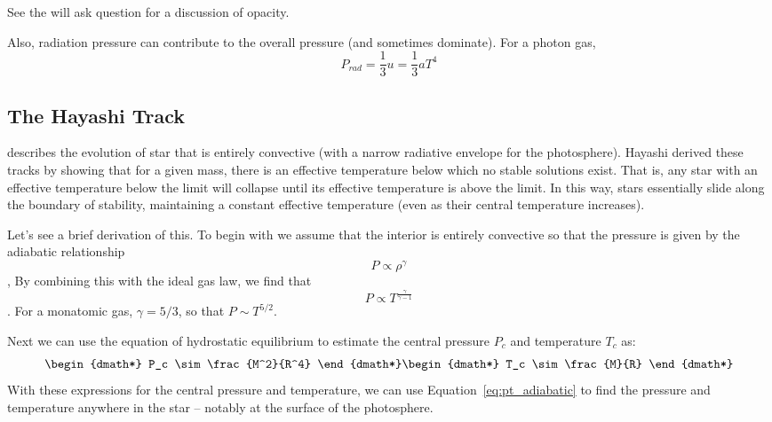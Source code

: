 See the will ask question for a discussion of opacity.

Also, radiation pressure can contribute to the overall pressure (and sometimes dominate).  
For a photon gas,
\begin{equation}
P_{rad}=\frac{1}{3}u=\frac{1}{3}aT^4
\end{equation}

\subsection{The Hayashi Track}
describes the evolution of star that is entirely convective
(with a narrow radiative envelope for the photosphere).
Hayashi derived these tracks by showing that for
a given mass, there is an effective temperature below which no stable solutions exist.
That is, any star with an effective temperature below the limit will collapse until its
effective temperature is above the limit.  In this way, stars essentially slide along
the boundary of stability, maintaining a constant effective temperature
(even as their central temperature increases).

Let's see a brief derivation of this.  To begin with we assume that the interior is entirely
convective so that the pressure is given by the adiabatic relationship
\begin{dmath}
    P\propto\rho^\gamma
\end{dmath},
By combining this with the ideal gas law, we find that
\begin{dmath}\label{eq:pt_adiabatic}
    P\propto T^{\frac{\gamma}{\gamma-1}}
\end{dmath}.
For a monatomic gas, $\gamma=5/3$, so that $P\sim T^{5/2}$.

Next we can use the equation of hydrostatic equilibrium to estimate the central pressure $P_c$ and
temperature $T_c$ as:
\begin{dgroup*}
\begin{dmath*}
    P_c \sim \frac{M^2}{R^4}
\end{dmath*}
\begin{dmath*}
    T_c \sim \frac{M}{R}
\end{dmath*}
\end{dgroup*}
With these expressions for the central pressure and temperature, we can use
Equation~\ref{eq:pt_adiabatic} to find the pressure and temperature anywhere in the
star -- notably at the surface of the photosphere.


